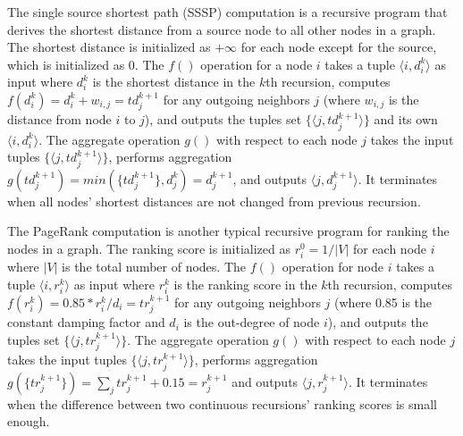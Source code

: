  The single source shortest path (SSSP) computation is a recursive program that derives the shortest distance from a source node to all other nodes in a graph. The shortest distance is initialized as $+\infty$ for each node except for the source, which is initialized as 0. The $f()$ operation for a node $i$ takes a tuple $\langle i,d_i^k\rangle$ as input where $d_i^k$ is the shortest distance in the $k$th recursion, computes $f(d_i^k)=d_i^k+w_{i,j}=td_j^{k+1}$ for any outgoing neighbors $j$ (where $w_{i,j}$ is the distance from node $i$ to $j$), and outputs the tuples set $\{\langle j,td_j^{k+1}\rangle\}$ and its own $\langle i,d_i^k\rangle$. The aggregate operation $g()$ with respect to each node $j$ takes the input tuples $\{\langle j,td_j^{k+1}\rangle\}$, performs aggregation $g(td_j^{k+1})=min(\{td_j^{k+1}\},d_j^k)=d_j^{k+1}$, and outputs $\langle j,d_j^{k+1}\rangle$. It terminates when all nodes' shortest distances are not changed from previous recursion.

 The PageRank computation is another typical recursive program for ranking the nodes in a graph. The ranking score is initialized as $r_i^0=1/|V|$ for each node $i$ where $|V|$ is the total number of nodes. The $f()$ operation for node $i$ takes a tuple $\langle i,r_i^k\rangle$ as input where $r_i^k$ is the ranking score in the $k$th recursion, computes $f(r_i^k)=0.85*r_i^k/d_i=tr_j^{k+1}$ for any outgoing neighbors $j$ (where 0.85 is the constant damping factor and $d_i$ is the out-degree of node $i$), and outputs the tuples set $\{\langle j,tr_j^{k+1}\rangle\}$. The aggregate operation $g()$ with respect to each node $j$ takes the input tuples $\{\langle j,tr_j^{k+1}\rangle\}$, performs aggregation $g(\{tr_j^{k+1}\})=\sum_j{tr_j^{k+1}}+0.15=r_j^{k+1}$ and outputs $\langle j,r_j^{k+1}\rangle$. It terminates when the difference between two continuous recursions' ranking scores is small enough.











